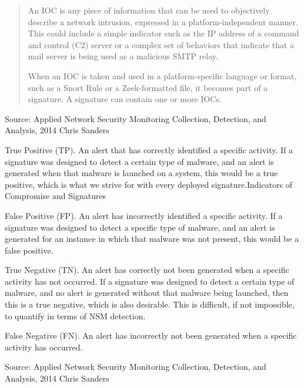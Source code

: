 \documentclass[Screen16to9,17pt]{foils}
\begin{document}

\begin{quote}
An IOC is any piece of information that can be used to objectively describe a network intrusion, expressed in a platform-independent manner. This could include a simple indicator such as the IP address of a command and control (C2) server or a complex set of behaviors that indicate that a mail server is being used as a malicious SMTP relay.

When an IOC is taken and used in a platform-specific language or format, such as a Snort Rule or a Zeek-formatted file, it becomes part of a signature. A signature can contain one or more IOCs.
\end{quote}

Source: Applied Network Security Monitoring Collection, Detection, and Analysis, 2014 Chris Sanders




\begin{list2}
\item True Positive (TP). An alert that has correctly identified a specific activity. If a signature was designed to detect a certain type of malware, and an alert is generated when that malware is launched on a system, this would be a true positive, which is what we strive for with every deployed signature.Indicators of Compromise and Signatures
\item False Positive (FP). An alert has incorrectly identified a specific activity. If a signature was designed to detect a specific type of malware, and an alert is generated for an instance in which that malware was not present, this would be a false positive.
\item True Negative (TN). An alert has correctly not been generated when a specific activity has not occurred. If a signature was designed to detect a certain type of malware, and no alert is generated without that malware being launched, then this is a true negative, which is also desirable. This is difficult, if not impossible, to quantify in terms of NSM detection.
\item False Negative (FN). An alert has incorrectly not been generated when a specific activity has occurred.
\end{list2}

Source: Applied Network Security Monitoring Collection, Detection, and Analysis, 2014 Chris Sanders
\end{document}
